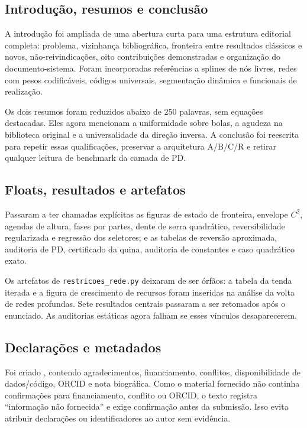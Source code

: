 \documentclass[11pt,a4paper]{article}
\begin{document}
\subsection{Introdução, resumos e conclusão}

A introdução foi ampliada de uma abertura curta para uma estrutura editorial completa:
problema, vizinhança bibliográfica, fronteira entre resultados clássicos e novos,
não-reivindicações, oito contribuições demonstradas e organização do documento-sistema.
Foram incorporadas referências a splines de nós livres, redes com pesos codificáveis,
códigos universais, segmentação dinâmica e funcionais de realização.

Os dois resumos foram reduzidos abaixo de 250 palavras, sem equações destacadas. Eles
agora mencionam a uniformidade sobre bolas, a agudeza na biblioteca original e a
universalidade da direção inversa. A conclusão foi reescrita para repetir essas
qualificações, preservar a arquitetura A/B/C/R e retirar qualquer leitura de benchmark
da camada de PD.

\subsection{Floats, resultados e artefatos}

Passaram a ter chamadas explícitas as figuras de estado de fronteira, envelope $C^2$,
agendas de altura, fases por partes, dente de serra quadrático, reversibilidade
regularizada e regressão dos seletores; e as tabelas de reversão aproximada, auditoria de
PD, certificado da quina, auditoria de constantes e caso quadrático exato.

Os artefatos de \texttt{restricoes\_rede.py} deixaram de ser órfãos: a tabela da tenda
iterada e a figura de crescimento de recursos foram inseridas na análise da volta de redes
profundas. Sete resultados centrais passaram a ser retomados após o enunciado. As
auditorias estáticas agora falham se esses vínculos desaparecerem.

\subsection{Declarações e metadados}

Foi criado , contendo agradecimentos, financiamento,
conflitos, disponibilidade de dados/código, ORCID e nota biográfica. Como o material
fornecido não continha confirmações para financiamento, conflito ou ORCID, o texto
registra ``informação não fornecida'' e exige confirmação antes da submissão. Isso evita
atribuir declarações ou identificadores ao autor sem evidência.
\end{document}
